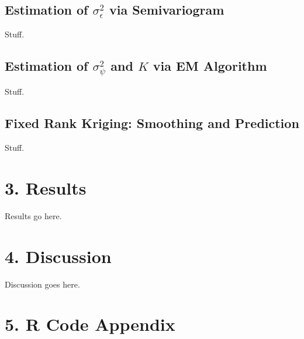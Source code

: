 \documentclass[11pt]{article}
\begin{document}
\subsection{Estimation of $\sigma^2_{\epsilon}$ via Semivariogram}

Stuff.\\

\subsection{Estimation of $\sigma^2_{\psi}$ and $K$ via EM Algorithm}

Stuff.\\

\subsection{Fixed Rank Kriging: Smoothing and Prediction}

Stuff.\\


\newpage
\section{3. Results}

Results go here. \\

\newpage
\section{4. Discussion}

Discussion goes here. \\

\newpage
\section{5. R Code Appendix}
\end{document}
